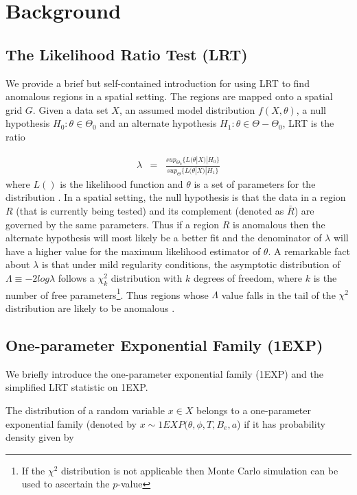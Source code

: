 \documentclass[AMA,LATO1COL]{WileyNJD-v2-bak}
\begin{document}
\section{Background}\label{BG}

\subsection{The Likelihood Ratio Test (LRT)}
We provide a brief but self-contained introduction for using LRT
to find anomalous regions in a spatial setting. The regions are mapped onto a spatial grid $G$. Given a data set $X$, an assumed model distribution $f(X,\theta)$, a null hypothesis $H_{0}: \theta \in \Theta_0 $ and an alternate hypothesis $H_{1}: \theta \in {\Theta-\Theta_0}$, LRT is the ratio

\begin{eqnarray}\label{eq}
\lambda &=& \frac{ sup_{\Theta_0}\{L(\theta|X)|H_{0}\}}
{sup_{\Theta}\{L(\theta|X)|H_{1}\}}
\end{eqnarray}
\noindent where $L()$ is the likelihood function and  $\theta$ is a set of parameters
for the distribution \cite{jour}. In a spatial setting, the null hypothesis is that the data in a region $R$ (that is currently being tested) and
its complement (denoted as $\bar R$) are governed by the same
parameters. Thus if a region $R$ is anomalous then the alternate hypothesis will most likely be a better fit and the denominator of $\lambda$ will have a higher value for the maximum likelihood estimator of $\theta$.  A remarkable fact about $\lambda$ is that under mild regularity conditions, the asymptotic distribution of $\Lambda \equiv -2log\lambda$ follows a $ \chi ^{2}_{k}$ distribution with $k$ degrees of freedom, where
$k$ is the number of free parameters\footnote{If the $\chi^{2}$ distribution is not applicable then Monte Carlo simulation can be used to ascertain the $p$-value}. Thus regions whose $\Lambda$ value falls in the tail of the $\chi^{2}$ distribution are likely to be anomalous \cite{jour}.

\subsection{One-parameter Exponential Family (1EXP)}
We briefly introduce the one-parameter exponential family (1EXP) and the simplified LRT statistic on 1EXP.

 The distribution of a random variable $x\in X$ belongs to a one-parameter exponential family \cite{DagMaxmize} (denoted by $x\sim 1EXP(\theta,\phi,T,B_e,a$) if it has probability density given by
\end{document}
